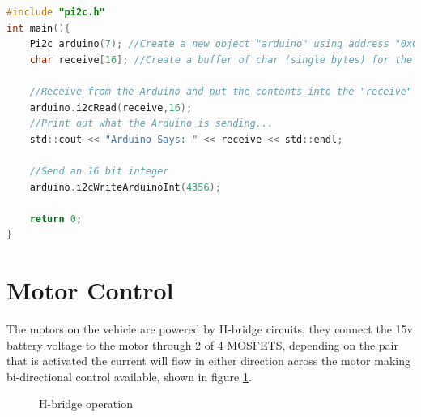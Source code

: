 \begin{lstlisting}[language=c,caption={i2c commands example file \cite{pi2c}},label={lst:pi2c_commands}]
#include "pi2c.h"
int main(){
    Pi2c arduino(7); //Create a new object "arduino" using address "0x07"
    char receive[16]; //Create a buffer of char (single bytes) for the data

    //Receive from the Arduino and put the contents into the "receive" char array
    arduino.i2cRead(receive,16);
    //Print out what the Arduino is sending...
    std::cout << "Arduino Says: " << receive << std::endl;

    //Send an 16 bit integer
    arduino.i2cWriteArduinoInt(4356);

    return 0;
}
\end{lstlisting}

\label{sec:i2c_on_pi}
	
	\section{Motor Control}
	
The motors on the vehicle are powered by H-bridge circuits, they connect the 15v battery voltage to the motor through 2 of 4 MOSFETS, depending on the pair that is activated the current will flow in either direction across the motor making bi-directional control available, shown in figure \ref{fig:h-bridge_diagram}.  
\begin{figure}[h]%
    \centering
    \qquad
    \caption{H-bridge operation \cite{h-bridge}}%
    \label{fig:h-bridge_diagram}%
\end{figure}

